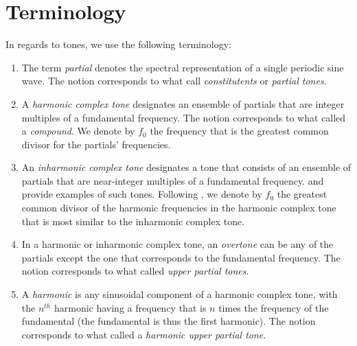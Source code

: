\documentclass{article}
\begin{document}
\section{Terminology}\label{ref:conventions}

In regards to tones, we use the following terminology:

\begin{enumerate}
    \item The term \emph{partial} denotes the spectral representation of a single periodic sine wave. The notion corresponds to what \citet[p.~23]{helmoltz1885sensations} call \emph{constitutents} or \emph{partial tones}.
    
    \item A \emph{harmonic complex tone} designates an ensemble of partials that are integer multiples of a fundamental frequency. The notion corresponds to what \citet[p.~23]{helmoltz1885sensations} called a \emph{compound}. We denote by $f_0$ the frequency that is the greatest common divisor for the partials' frequencies.
    
    \item An \emph{inharmonic complex tone} designates a tone that consists of an ensemble of partials that are near-integer multiples of a fundamental frequency. \citet{fletcher1962quality} and \citet[p.~9]{rasch1982perception} provide examples of such tones. Following \citet[p.~757]{fletcher1962quality}, we denote by $f_0$ the greatest common divisor of the harmonic frequencies in the harmonic complex tone that is most similar to the inharmonic complex tone. 
    
    
    \item In a harmonic or inharmonic complex tone, an \emph{overtone} can be any of the partials except the one that corresponds to the fundamental frequency. The notion corresponds to what \citet[p.~23]{helmoltz1885sensations} called \emph{upper partial tones}.
    
    \item A {\em harmonic\/} is any sinusoidal component of a harmonic complex tone, with the $n^{th}$ harmonic having a frequency that is $n$ times the frequency of the fundamental (the fundamental is thus the first harmonic). The notion corresponds to what \citet[p.~23]{helmoltz1885sensations} called a \emph{harmonic upper partial tone}.
\end{enumerate}
\end{document}
